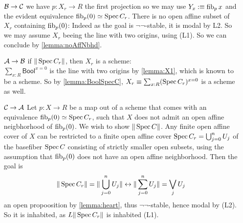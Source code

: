 \documentclass{article}
\newcommand{\Bool}{\mathsf{Bool}}
\begin{document}
\begin{enumerate}
	\item [$\mathcal{B} \rightarrow \mathcal{C}$]
	we have $p : X_r \to R$ the first projection so we may use $Y_x :\equiv \operatorname{fib}_p x$ and the evident equivalence $\operatorname{fib}_p(0) \simeq \operatorname{Spec} C_r$.
	There is no open affine subset of $X_r$ containing $\operatorname{fib}_p(0)$: Indeed as the goal is $\lnot \lnot$-stable, it is modal by L2. So we may assume $X_r$ beeing the line with two origins, using (L1). So we can conclude by \ref{lemma:noAffNbhd}.
	\item [$\mathcal{A} \rightarrow \mathcal{B}$]
	if $\|\operatorname{Spec} C_r\|$, then $X_r$ is a scheme: \\
	$\sum_{x : R} \Bool^{x = 0}$ is the line with two origins by \ref{lemma:X1}, which is known to be a scheme. So by \ref{lemma:BoolSpecC}, $X_r \equiv \sum_{x : R} (\operatorname{Spec} C_r)^{x=0}$ is a scheme as well. 
	\item [$\mathcal{C} \rightarrow \mathcal{A}$]
 Let $p : X \to R$ be a map out of a scheme that comes with an equivalence $\operatorname{fib}_p(0) \simeq \operatorname{Spec} C_r$, such that $X$ does not admit an open affine neigbhorhood of $\operatorname{fib}_p(0)$. We wish to show $\|\operatorname{Spec} C\|$. Any finite open affine cover of $X$ can be restricted to a finite open affine cover $\operatorname{Spec} C_r= \bigcup_{j=0}^{n} U_j$ of the basefiber $\operatorname{Spec} C$ consisting of strictly smaller open subsets, using the assumption that $\operatorname{fib}_p(0)$ does not have an open affine neighborhood. 
	Then the goal is
	\[
	\| \operatorname{Spec} C_r\| = \| \bigcup_{j=0}^{n} U_j \| \leftrightarrow \| \sum_{j=0}^n U_j\| = \bigvee_j  U_j
	\]
	an open propoosition by \ref{lemma:heart}, thus $\lnot \lnot$-stable, hence modal by (L2). So it is inhabited, as $L \|\operatorname{Spec} C_r\|$ is inhabited (L1).
\end{enumerate}
\printbibliography
\end{document}
